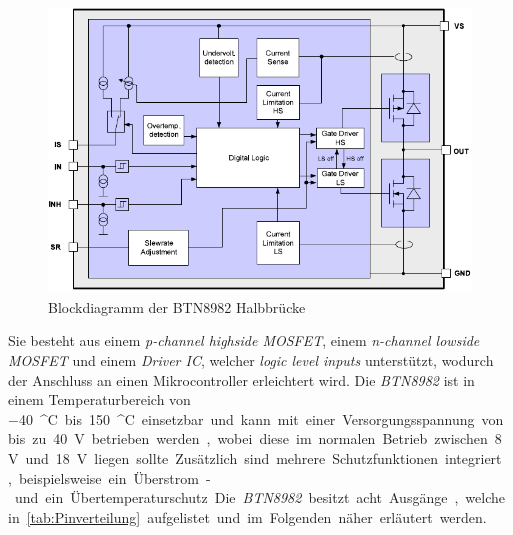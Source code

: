 \begin{figure} [H]
	\centering
	\includegraphics[width=0.65\linewidth]{Bilder/btn8982.pdf}
	\caption{Blockdiagramm der BTN8982 Halbbrücke \cite[S.4]{btn}}
	\label{fig:btn8982}
\end{figure}\noindent
Sie besteht aus einem \textit{p-channel highside MOSFET}, einem \textit{n-channel lowside MOSFET} und einem \textit{Driver IC}, welcher \textit{logic level inputs} unterstützt, wodurch der Anschluss an einen Mikrocontroller erleichtert wird. Die \textit{BTN8982} ist in einem Temperaturbereich von \SI{-40}{^\circ C} bis \SI{150}{^\circ C} einsetzbar und kann mit einer Versorgungsspannung von bis zu \SI{40}{V} betrieben werden, wobei diese im normalen Betrieb zwischen \SI{8}{V} und \SI{18}{V} liegen sollte. Zusätzlich sind mehrere Schutzfunktionen integriert, beispielsweise ein Überstrom- und ein Übertemperaturschutz. Die \textit{BTN8982} besitzt acht Ausgänge, welche in \autoref{tab:Pinverteilung} aufgelistet und im Folgenden näher erläutert werden.

